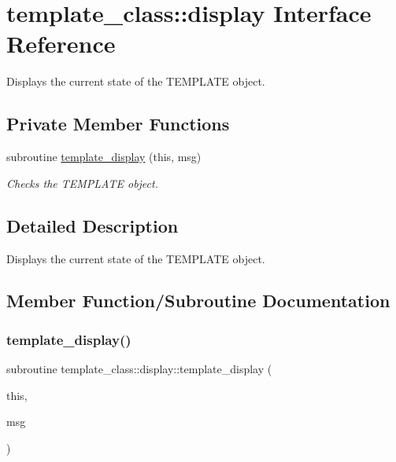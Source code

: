 \hypertarget{interfacetemplate__class_1_1display}{}\section{template\+\_\+class\+:\+:display Interface Reference}
\label{interfacetemplate__class_1_1display}


Displays the current state of the T\+E\+M\+P\+L\+A\+TE object.  


\subsection*{Private Member Functions}
\begin{DoxyCompactItemize}
\item 
subroutine \hyperlink{interfacetemplate__class_1_1display_aedd91f472026140560fdadc2117ed68c}{template\+\_\+display} (this, msg)
\begin{DoxyCompactList}\small\item\em Checks the T\+E\+M\+P\+L\+A\+TE object. \end{DoxyCompactList}\end{DoxyCompactItemize}


\subsection{Detailed Description}
Displays the current state of the T\+E\+M\+P\+L\+A\+TE object. 

\subsection{Member Function/\+Subroutine Documentation}
\mbox{\label{interfacetemplate__class_1_1display_aedd91f472026140560fdadc2117ed68c}} 
\subsubsection{\texorpdfstring{template\+\_\+display()}{template\_display()}}
{\footnotesize\ttfamily subroutine template\+\_\+class\+::display\+::template\+\_\+display (\begin{DoxyParamCaption}\item[{type(\hyperlink{structtemplate__class_1_1template}{template}), intent(in)}]{this,  }\item[{character$\ast$($\ast$), intent(in), optional}]{msg }\end{DoxyParamCaption})\hspace{0.3cm}{\ttfamily [private]}}



